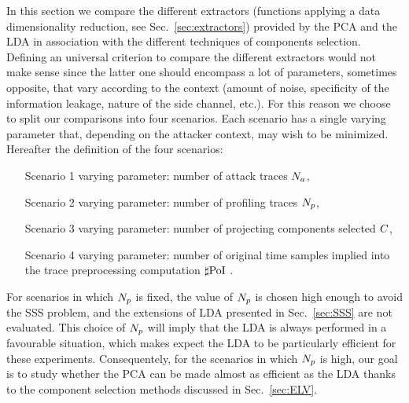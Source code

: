 In this section we compare the different extractors (\ie functions applying a data dimensionality reduction, see Sec.~\ref{sec:extractors}) provided by the PCA and the LDA in association with the different techniques  of components selection. Defining an universal criterion to compare the different extractors would not make sense since the latter one should encompass a lot of parameters, sometimes opposite, that vary according to the context (amount of noise, specificity of the information leakage, nature of the side channel, etc.). For this reason we choose to split our comparisons into four scenarios. Each scenario has a single varying parameter that, depending on the attacker context, may wish to be minimized. Hereafter the definition of the four scenarios: 
\begin{itemize}
\item[Scenario 1] varying parameter: number of attack traces $N_a$, 
\item[Scenario 2] varying parameter: number of profiling traces $N_p$, 
\item[Scenario 3] varying parameter: number of projecting components selected $C$,
\item[Scenario 4] varying parameter: number of original time samples implied into the trace preprocessing computation $\sharp\mathrm{PoI}$ .
\end{itemize}
 
For scenarios in which $N_p$ is fixed, the value of $N_p$ is chosen high enough to avoid the SSS problem, and the extensions of LDA presented in Sec.~\ref{sec:SSS} are not evaluated.
 This choice of $N_p$ will imply that the LDA is always performed in a favourable situation, which makes expect the LDA to be particularly efficient for these experiments. Consequentely, for the scenarios in which $N_p$ is high, our goal is to study whether the PCA can be made almost as efficient as the LDA thanks to the component selection methods discussed in Sec.~\ref{sec:ELV}. 



